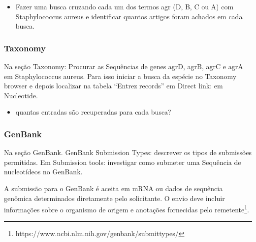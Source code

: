 \begin{itemize}
    \item Fazer uma busca cruzando cada um dos termos agr (D, B, C ou A) com Staphylococcus aureus e  identificar quantos artigos foram achados em cada busca.
\end{itemize}


\subsubsection{Taxonomy}
\label{section:taxonomy}

Na seção Taxonomy: Procurar as Sequências de genes agrD, agrB, agrC e agrA em Staphylococcus aureus. 
Para isso iniciar a busca da espécie no Taxonomy browser e depois localizar na tabela “Entrez records” em Direct link: em Nucleotide. 

\begin{itemize}
    \item quantas entradas são recuperadas para cada busca? 
\end{itemize}


\subsubsection{GenBank}
Na seção GenBank. 
GenBank Submission Types: descrever os tipos de submissões permitidas. 
Em Submission tools: investigar como submeter uma Sequência de nucleotídeos no GenBank.

A submissão para o GenBank é aceita em mRNA ou dados de sequência genômica determinados diretamente pelo solicitante. 
O envio deve incluir informações sobre o organismo de origem e anotações fornecidas pelo remetente\footnote{https://www.ncbi.nlm.nih.gov/genbank/submit\underline{\hspace{.1in}}types/}.